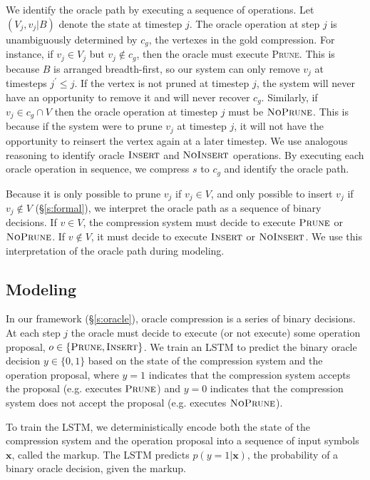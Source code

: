 \documentclass[11pt,a4paper]{article}
\begin{document}
We identify the oracle path by executing  a sequence of operations. Let $(V_j, v_j | B)$ denote the state at timestep $j$. The oracle operation at step $j$ is unambiguously determined by $c_g$, the vertexes in the gold compression. For instance, if $v_j \in V_j$ but $v_j \notin c_g$, then the oracle must execute \textsc{Prune}. This is because $B$ is arranged breadth-first, so our system can only remove $v_j$ at timesteps $j^{\prime} \leq j$. If the vertex is not pruned at timestep $j$, the system will never have an opportunity to remove it and will never recover $c_g$. Similarly, if $v_j \in c_g \cap V$ then the oracle operation at timestep $j$ must be $\textsc{NoPrune}$. This is because if the system were to prune $v_j$ at timestep $j$, it will not have the opportunity to reinsert the vertex again at a later timestep. We use analogous reasoning to identify oracle $\textsc{Insert}$ and $\textsc{NoInsert}$ operations. By executing each oracle operation in sequence, we compress $s$ to $c_g$ and identify the oracle path.

Because it is only possible to prune $v_j$ if $v_j \in V$, and only possible to insert $v_j$ if $v_j \notin V$ (\S\ref{s:formal}), we interpret the oracle path as a sequence of binary decisions. If $v \in V$, the compression system must decide to execute $\textsc{Prune}$ or $\textsc{NoPrune}$. If $v \notin V$, it must decide to execute $\textsc{Insert}$ or $\textsc{NoInsert}$. We use this interpretation of the oracle path during modeling.

\subsection{Modeling}\label{s:modeling}

In our framework (\S\ref{s:oracle}), oracle compression is a series of binary decisions. At each step $j$ the oracle must decide to execute (or not execute) some operation proposal, $o \in \{\textsc{Prune}, \textsc{Insert}\}$. We train an LSTM to predict the binary oracle decision $y \in \{0,1\}$ based on the state of the compression system and the operation proposal, where $y=1$ indicates that the compression system accepts the proposal (e.g. executes $\textsc{Prune}$) and $y=0$ indicates that the compression system does not accept the proposal (e.g. executes $\textsc{NoPrune}$).

To train the LSTM, we deterministically encode both the state of the compression system and the operation proposal into a sequence of input symbols $\bm{x}$, called the markup. The LSTM predicts $p(y=1 | \bm{x})$, the probability of a binary oracle decision, given the markup. 
\end{document}
